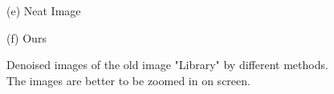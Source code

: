 \documentclass[runningheads]{llncs}
\begin{document}
\begin{figure}
{\begin{minipage}[t]{0.33\textwidth}
{\footnotesize (e) Neat Image}
\end{minipage}
\begin{minipage}[t]{0.33\textwidth}
\centering
{}
{\footnotesize (f) Ours }
\end{minipage}
}
\caption{Denoised images of the old image "Library" by different methods. The images are better to be zoomed in on screen.}
\label{fig19}
\end{figure}
\end{document}
